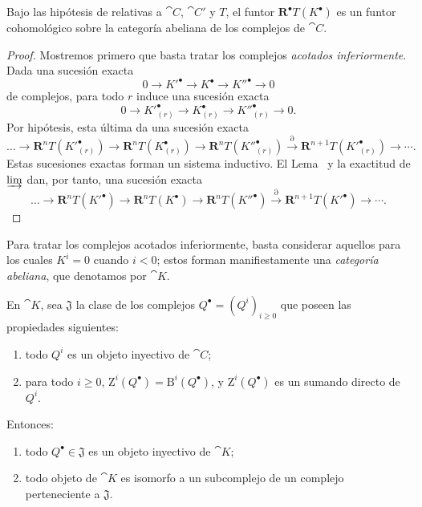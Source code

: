 \documentclass[oneside]{amsart}
\renewcommand{\geq}{\geqslant}
\newcommand{\oldpage}[2][]{{\marginnote{\normalfont\textbf{#1}~|~#2}}\ignorespaces}
\let\EGAOriginalLabel\label
\renewcommand{\label}[1]{\phantomsection\EGAOriginalLabel{#1}}
\begin{document}
\begin{proposition}[11.5.2]
\label{0.11.5.2}
Bajo las hipótesis de  relativas a $\cat{C}$, $\cat{C}'$ y $T$, el funtor $\mathbf{R}^\bullet T(K^\bullet)$ es un funtor cohomológico sobre la categoría abeliana de los complejos de $\cat{C}$.
\end{proposition}

\begin{proof}
Mostremos primero que basta tratar los complejos \emph{acotados inferiormente}.
Dada una sucesión exacta
\[
  0\longrightarrow K'^\bullet\longrightarrow K^\bullet
  \longrightarrow K''^\bullet\longrightarrow 0
\]
de complejos, para todo $r$ induce una sucesión exacta
\[
  0\longrightarrow K'^\bullet_{(r)}\longrightarrow K^\bullet_{(r)}
  \longrightarrow K''^\bullet_{(r)}\longrightarrow 0.
\]
Por hipótesis, esta última da una sucesión exacta
\[
  \ldots\longrightarrow\mathbf{R}^nT(K'^\bullet_{(r)})
  \longrightarrow\mathbf{R}^nT(K^\bullet_{(r)})
  \longrightarrow\mathbf{R}^nT(K''^\bullet_{(r)})
  \xrightarrow{\partial}\mathbf{R}^{n+1}T(K'^\bullet_{(r)})
  \longrightarrow\cdots .
\]
Estas sucesiones exactas forman un sistema inductivo.
El Lema~ y la exactitud de $\varinjlim$ dan, por tanto, una sucesión exacta
\[
  \ldots\longrightarrow\mathbf{R}^nT(K'^\bullet)
  \longrightarrow\mathbf{R}^nT(K^\bullet)
  \longrightarrow\mathbf{R}^nT(K''^\bullet)
  \xrightarrow{\partial}\mathbf{R}^{n+1}T(K'^\bullet)
  \longrightarrow\cdots .
\]
\end{proof}

Para tratar los complejos acotados inferiormente, basta considerar aquellos para los cuales $K^i=0$ cuando $i<0$; estos forman manifiestamente una \emph{categoría abeliana}, que denotamos por $\cat{K}$.

\begin{lemma}[11.5.2.1]
\label{0.11.5.2.1}
En $\cat{K}$, sea $\mathfrak{J}$ la clase de los complejos $Q^\bullet=(Q^i)_{i\geq0}$ que poseen las
\oldpage[0\textsubscript{III}]{37}
propiedades siguientes:
\begin{enumerate}
  \item[{\rm(1)}] todo $Q^i$ es un objeto inyectivo de $\cat{C}$;
  \item[{\rm(2)}] para todo $i\geq0$, $\mathrm{Z}^i(Q^\bullet)=\mathrm{B}^i(Q^\bullet)$, y $\mathrm{Z}^i(Q^\bullet)$ es un sumando directo de $Q^i$.
\end{enumerate}
Entonces:
\begin{enumerate}
  \item[{\rm(i)}] todo $Q^\bullet\in\mathfrak{J}$ es un objeto inyectivo de $\cat{K}$;
  \item[{\rm(ii)}] todo objeto de $\cat{K}$ es isomorfo a un subcomplejo de un complejo perteneciente a $\mathfrak{J}$.
\end{enumerate}
\end{lemma}
\end{document}
